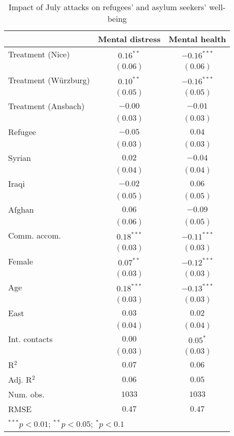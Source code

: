 
\begin{table}
\caption{Impact of July attacks on refugees' and asylum seekers' well-being}
\begin{center}
\begin{tabular}{l c c}
\toprule
 & Mental distress & Mental health \\
\midrule
Treatment (Nice)     & $0.16^{**}$  & $-0.16^{***}$ \\
                     & $(0.06)$     & $(0.06)$      \\
Treatment (Würzburg) & $0.10^{**}$  & $-0.16^{***}$ \\
                     & $(0.05)$     & $(0.05)$      \\
Treatment (Ansbach)  & $-0.00$      & $-0.01$       \\
                     & $(0.03)$     & $(0.03)$      \\
Refugee              & $-0.05$      & $0.04$        \\
                     & $(0.03)$     & $(0.03)$      \\
Syrian               & $0.02$       & $-0.04$       \\
                     & $(0.04)$     & $(0.04)$      \\
Iraqi                & $-0.02$      & $0.06$        \\
                     & $(0.05)$     & $(0.05)$      \\
Afghan               & $0.06$       & $-0.09$       \\
                     & $(0.06)$     & $(0.05)$      \\
Comm. accom.         & $0.18^{***}$ & $-0.11^{***}$ \\
                     & $(0.03)$     & $(0.03)$      \\
Female               & $0.07^{**}$  & $-0.12^{***}$ \\
                     & $(0.03)$     & $(0.03)$      \\
Age                  & $0.18^{***}$ & $-0.13^{***}$ \\
                     & $(0.03)$     & $(0.03)$      \\
East                 & $0.03$       & $0.02$        \\
                     & $(0.04)$     & $(0.04)$      \\
Int. contacts        & $0.00$       & $0.05^{*}$    \\
                     & $(0.03)$     & $(0.03)$      \\
\midrule
R$^2$                & $0.07$       & $0.06$        \\
Adj. R$^2$           & $0.06$       & $0.05$        \\
Num. obs.            & $1033$       & $1033$        \\
RMSE                 & $0.47$       & $0.47$        \\
\bottomrule
\multicolumn{3}{l}{\scriptsize{$^{***}p<0.01$; $^{**}p<0.05$; $^{*}p<0.1$}}
\end{tabular}
\label{tab_mhealth}
\end{center}
\end{table}
